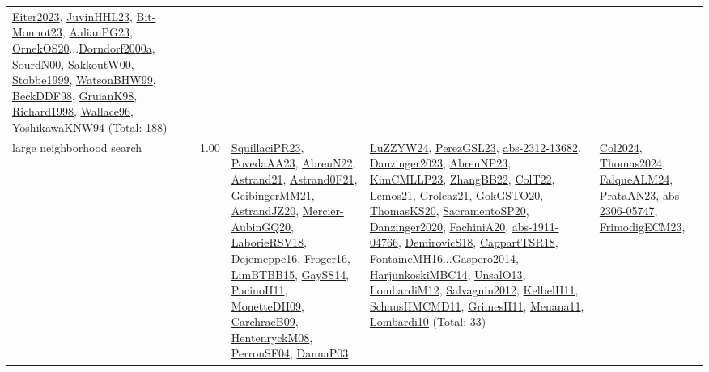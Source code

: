 {\begin{longtable}{p{3cm}r>{\raggedright\arraybackslash}p{6cm}>{\raggedright\arraybackslash}p{6cm}>{\raggedright\arraybackslash}p{8cm}}
\hyperref[detail:Eiter2023]{Eiter2023}, \hyperref[detail:JuvinHHL23]{JuvinHHL23}, \hyperref[detail:Bit-Monnot23]{Bit-Monnot23}, \hyperref[detail:AalianPG23]{AalianPG23}, \hyperref[detail:OrnekOS20]{OrnekOS20}...\hyperref[detail:Dorndorf2000a]{Dorndorf2000a}, \hyperref[detail:SourdN00]{SourdN00}, \hyperref[detail:SakkoutW00]{SakkoutW00}, \hyperref[detail:Stobbe1999]{Stobbe1999}, \hyperref[detail:WatsonBHW99]{WatsonBHW99}, \hyperref[detail:BeckDDF98]{BeckDDF98}, \hyperref[detail:GruianK98]{GruianK98}, \hyperref[detail:Richard1998]{Richard1998}, \hyperref[detail:Wallace96]{Wallace96}, \hyperref[detail:YoshikawaKNW94]{YoshikawaKNW94} (Total: 188)\\
\index{large neighborhood search}\index{Algorithms!large neighborhood search}large neighborhood search &  1.00 & \hyperref[detail:SquillaciPR23]{SquillaciPR23}, \hyperref[detail:PovedaAA23]{PovedaAA23}, \hyperref[detail:AbreuN22]{AbreuN22}, \hyperref[detail:Astrand21]{Astrand21}, \hyperref[detail:Astrand0F21]{Astrand0F21}, \hyperref[detail:GeibingerMM21]{GeibingerMM21}, \hyperref[detail:AstrandJZ20]{AstrandJZ20}, \hyperref[detail:Mercier-AubinGQ20]{Mercier-AubinGQ20}, \hyperref[detail:LaborieRSV18]{LaborieRSV18}, \hyperref[detail:Dejemeppe16]{Dejemeppe16}, \hyperref[detail:Froger16]{Froger16}, \hyperref[detail:LimBTBB15]{LimBTBB15}, \hyperref[detail:GaySS14]{GaySS14}, \hyperref[detail:PacinoH11]{PacinoH11}, \hyperref[detail:MonetteDH09]{MonetteDH09}, \hyperref[detail:CarchraeB09]{CarchraeB09}, \hyperref[detail:HentenryckM08]{HentenryckM08}, \hyperref[detail:PerronSF04]{PerronSF04}, \hyperref[detail:DannaP03]{DannaP03} & \hyperref[detail:LuZZYW24]{LuZZYW24}, \hyperref[detail:PerezGSL23]{PerezGSL23}, \hyperref[detail:abs-2312-13682]{abs-2312-13682}, \hyperref[detail:Danzinger2023]{Danzinger2023}, \hyperref[detail:AbreuNP23]{AbreuNP23}, \hyperref[detail:KimCMLLP23]{KimCMLLP23}, \hyperref[detail:ZhangBB22]{ZhangBB22}, \hyperref[detail:ColT22]{ColT22}, \hyperref[detail:Lemos21]{Lemos21}, \hyperref[detail:Groleaz21]{Groleaz21}, \hyperref[detail:GokGSTO20]{GokGSTO20}, \hyperref[detail:ThomasKS20]{ThomasKS20}, \hyperref[detail:SacramentoSP20]{SacramentoSP20}, \hyperref[detail:Danzinger2020]{Danzinger2020}, \hyperref[detail:FachiniA20]{FachiniA20}, \hyperref[detail:abs-1911-04766]{abs-1911-04766}, \hyperref[detail:DemirovicS18]{DemirovicS18}, \hyperref[detail:CappartTSR18]{CappartTSR18}, \hyperref[detail:FontaineMH16]{FontaineMH16}...\hyperref[detail:Gaspero2014]{Gaspero2014}, \hyperref[detail:HarjunkoskiMBC14]{HarjunkoskiMBC14}, \hyperref[detail:UnsalO13]{UnsalO13}, \hyperref[detail:LombardiM12]{LombardiM12}, \hyperref[detail:Salvagnin2012]{Salvagnin2012}, \hyperref[detail:KelbelH11]{KelbelH11}, \hyperref[detail:SchausHMCMD11]{SchausHMCMD11}, \hyperref[detail:GrimesH11]{GrimesH11}, \hyperref[detail:Menana11]{Menana11}, \hyperref[detail:Lombardi10]{Lombardi10} (Total: 33) & \hyperref[detail:Col2024]{Col2024}, \hyperref[detail:Thomas2024]{Thomas2024}, \hyperref[detail:FalqueALM24]{FalqueALM24}, \hyperref[detail:PrataAN23]{PrataAN23}, \hyperref[detail:abs-2306-05747]{abs-2306-05747}, \hyperref[detail:FrimodigECM23]{FrimodigECM23}, 
\end{longtable}}

